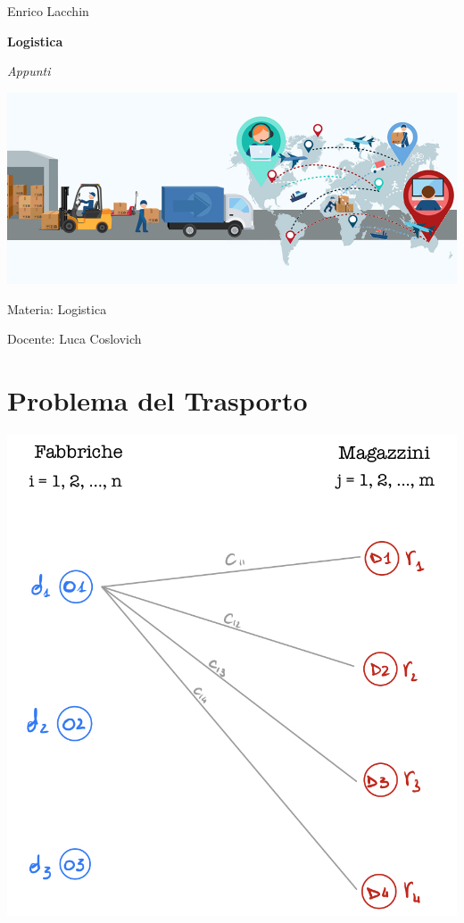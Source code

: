 \documentclass[12pt,a4paper]{article}
\begin{document}

\small{Enrico Lacchin}

\MidSep
\textbf{\LARGE{Logistica}}

\MidSep
\textit{\Large{Appunti}}
\Sep

\begin{center}
\includegraphics[width=1\columnwidth]{img/logistica.png}
\end{center}

\vfill
Materia: Logistica

Docente: Luca Coslovich


\clearpage
{}
\setcounter{page}{1}
\tableofcontents

\clearpage

\setcounter{page}{1}

\section{Problema del Trasporto}
\begin{center}
\includegraphics[width=0.6\columnwidth]{img/trasporto.jpeg}
\end{center}
\end{document}
